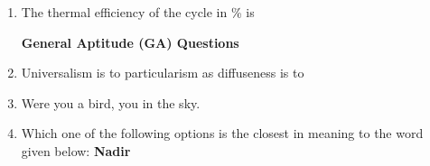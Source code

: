 \documentclass[journal]{IEEEtran}
\begin{document}
\begin{enumerate}[leftmargin=0pt]
\item The thermal efficiency of the cycle in \% is
\begin{enumerate}
\end{enumerate}
\hfill{}

\textbf{General Aptitude (GA) Questions}
\item Universalism is to particularism as diffuseness is to \underline{\hspace{2cm}} 
\begin{enumerate}
\end{enumerate}
\hfill{}

\item Were you a bird, you \underline{\hspace{2cm}} in the sky.
\begin{enumerate}
\end{enumerate}
\hfill{}

\item Which one of the following options is the closest in meaning to the word given below:  
\textbf{Nadir}
\begin{enumerate}
\end{enumerate}
\hfill{}


\end{enumerate}
\end{document}
